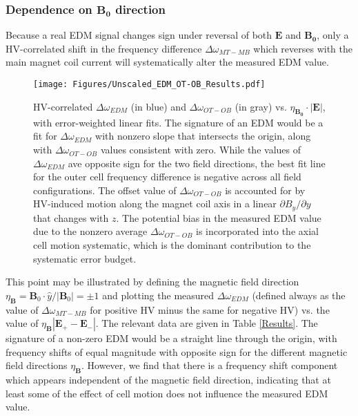 \documentclass [10pt, twoside] {uwthesis}[2012/04/02]
\begin{document}
\subsubsection{Dependence on $\mathbf{B_0}$ direction}
Because a real EDM signal changes sign under reversal of both $\mathbf{E}$ and $\mathbf{B_0}$, only a HV-correlated shift in the frequency difference $\Delta\omega_{MT-MB}$ which reverses with the main magnet coil current will systematically alter the measured EDM value.
\begin{figure}
\begin{center}
\texttt{[image: Figures/Unscaled\_EDM\_OT-OB\_Results.pdf]}
\end{center}
\caption[$\Delta\omega_{EDM}$ and $\Delta\omega_{OT-OB}$ frequency shifts vs. field configuration]
{\narrower HV-correlated $\Delta\omega_{EDM}$ (in blue) and $\Delta\omega_{OT-OB}$ (in gray) vs. $\eta_{\mathbf{B_0}}\cdot |\mathbf{E}|$, with error-weighted linear fits. The signature of an EDM would be a fit for $\Delta\omega_{EDM}$ with nonzero slope that intersects the origin, along with $\Delta\omega_{OT-OB}$ values consistent with zero. While the values of $\Delta\omega_{EDM}$ ave opposite sign for the two field directions, the best fit line for the outer cell frequency difference is negative across all field configurations. The offset value of $\Delta\omega_{OT-OB}$ is accounted for by HV-induced motion along the magnet coil axis in a linear $\partial B_y/\partial y$ that changes with $z$. The potential bias in the measured EDM value due to the nonzero average $\Delta\omega_{OT-OB}$ is incorporated into the axial cell motion systematic, which is the dominant contribution to the systematic error budget.}
\label{Frequency_Shifts}
\end{figure}
This point may be illustrated by defining the magnetic field direction $\eta_{\mathbf{B}} = \mathbf{B}_0 \cdot \hat{y}/|\mathbf{B}_0| = \pm 1$ and plotting the measured $\Delta \omega_{EDM}$ (defined always as the value of $\Delta\omega_{MT-MB}$ for positive HV minus the same for negative HV) vs. the value of $\eta_{\mathbf{B}}|\mathbf{E_+}-\mathbf{E_-}|$. The relevant data are given in Table \ref{Results}. The signature of a non-zero EDM would be a straight line through the origin, with frequency shifts of equal magnitude with opposite sign for the different magnetic field directions $\eta_{\mathbf{B}}$. However, we find that there is a frequency shift component which appears independent of the magnetic field direction, indicating that at least some of the effect of cell motion does not influence the measured EDM value.
\end{document}
